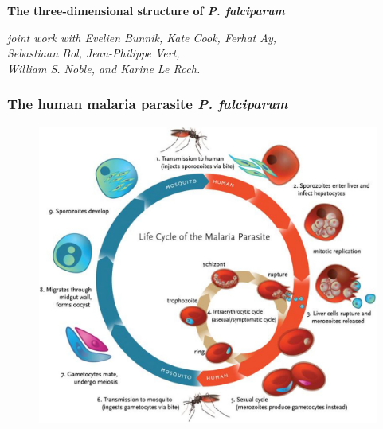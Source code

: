 \documentclass[11pt,xcolor=dvipsnames]{beamer}
\begin{document}
\begin{frame}
\begin{overlayarea}{12cm}{4cm}
{\begin{itemize}
{}
\end{itemize}
}
\end{overlayarea}
\end{frame}



\begin{frame}
\Large{ \bf
The three-dimensional structure of {\em P. falciparum}
}

\begin{flushright}
\vspace{1em}
\small
\textit{joint work with 
Evelien Bunnik, Kate Cook, Ferhat Ay, \\
Sebastiaan Bol, Jean-Philippe Vert, \\ William S. Noble, and Karine
Le Roch.}
\end{flushright}

\end{frame}

\begin{frame}
\frametitle{The human malaria parasite {\em P. falciparum}}

\begin{figure}
\includegraphics[width=0.75\linewidth]{figures/plasmodium_lifecycle.jpg}
\end{figure}
\end{frame}
\end{document}
